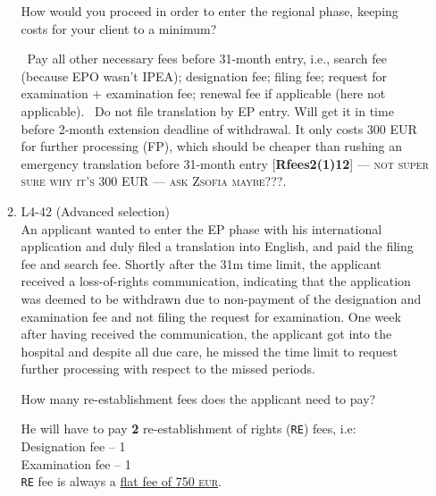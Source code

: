 \documentclass{report}
\newcommand{\s}{\adforn{74} \ }
\begin{document}
\begin{enumerate}[label=\textbf{Answer \arabic*}]
\begin{enumerate}[label=\textbf{Answer \arabic*}]
    \vspace{1em}
    How would you proceed in order to enter the regional phase, keeping costs for your client to a minimum?

        \vspace{1em}
        
     \s Pay all other necessary fees before 31-month entry, i.e., search fee (because EPO wasn't IPEA); designation fee; filing fee; request for examination + examination fee; renewal fee if applicable (here not applicable).
     \s Do not file translation by EP entry. Will get it in time before 2-month extension deadline of withdrawal. It only costs \textsc{300 EUR} for further processing (FP), which should be cheaper than rushing an emergency translation before 31-month entry [\textbf{Rfees2(1)12}] --- \textsc{not super sure why it's 300 EUR --- ask Zsofia maybe???}. 
    \item %
    L4-42 (Advanced selection) \\
    An applicant wanted to enter the EP phase with his international application and duly filed a translation into English, and paid the filing fee and search fee. Shortly after the 31m time limit, the applicant received a loss-of-rights communication, indicating that the application was deemed to be withdrawn due to non-payment of the designation and examination fee and not filing the request for examination. One week after having received the communication, the applicant got into the hospital and despite all due care, he missed the time limit to request further processing with respect to the missed periods. 
    
    \vspace{1em}
    How many re-establishment fees does the applicant need to pay? 

    \vspace{1em}
    
    He will have to pay \textbf{2} re-establishment of rights (\texttt{RE}) fees, i.e:\\
    Designation fee -- 1 \\
    Examination fee -- 1\\
    \texttt{RE} fee is always a \underline{flat fee of \textsc{750 eur}}. 
    
\end{enumerate}
\end{enumerate}
\end{document}
